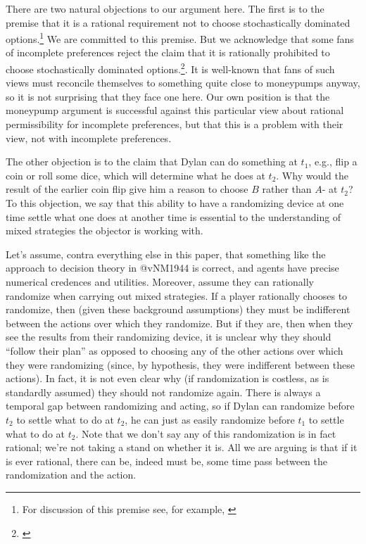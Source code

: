 \documentclass[
  11pt,
  letterpaper]{article}
\begin{document}
There are two natural objections to our argument here. The first is to the premise that it is a rational requirement not to choose stochastically dominated options.\footnote{For discussion of this premise see, for example, \citet{hare2010take,bader2018stochastic,ledermanmarbles,tarsneyexpected}} We are committed to this premise. But we acknowledge that some fans of incomplete preferences reject the claim that it is rationally prohibited to choose stochastically dominated options.\footnote{ \citet{bales2014decision,schoenfield2014decision}}. It is well-known that fans of such views must reconcile themselves to something quite close to moneypumps anyway, so it is not surprising that they face one here. Our own position is that the moneypump argument is successful against this particular view about rational permissibility for incomplete preferences, but that this is a problem with their view, not with incomplete preferences.

The other objection is to the claim that Dylan can do something at $t_1$, e.g., flip a coin or roll some dice, which will determine what he does at $t_2$. Why would the result of the earlier coin flip give him a reason to choose $B$ rather than $A$- at $t_2$? To this objection, we say that this ability to have a randomizing device at one time settle what one does at another time is essential to the understanding of mixed strategies the objector is working with.

Let's assume, contra everything else in this paper, that something like the approach to decision theory in @vNM1944 is correct, and agents have precise numerical credences and utilities. Moreover, assume they can rationally randomize when carrying out mixed strategies. If a player rationally chooses to randomize, then (given these background assumptions) they must be indifferent between the actions over which they randomize. But if they are, then when they see the results from their randomizing device, it is unclear why they should ``follow their plan'' as opposed to choosing any of the other actions over which they were randomizing (since, by hypothesis, they were indifferent between these actions). In fact, it is not even clear why (if randomization is costless, as is standardly assumed) they should not randomize again. There is always a temporal gap between randomizing and acting, so if Dylan can randomize before $t_2$ to settle what to do at $t_2$, he can just as easily randomize before $t_1$ to settle what to do at $t_2$. Note that we don't say any of this randomization is in fact rational; we're not taking a stand on whether it is. All we are arguing is that if it is ever rational, there can be, indeed must be, some time pass between the randomization and the action.
\end{document}
